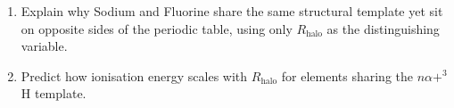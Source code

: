\begin{exercisebox}
\begin{enumerate}
    \item Explain why Sodium and Fluorine share the same structural template yet sit on opposite sides of the periodic table, using only $R_{\text{halo}}$ as the distinguishing variable.
    \item Predict how ionisation energy scales with $R_{\text{halo}}$ for elements sharing the $n\alpha + ^3$H template.
\end{enumerate}
\end{exercisebox}

